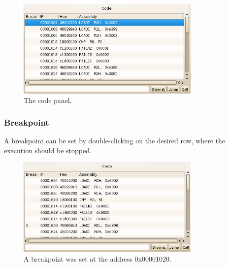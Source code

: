 \begin{figure}[H]
\begin{center}
	\includegraphics[width=0.8\textwidth]{./files/emu_gui_code_main.png}
\end{center}
	\caption{The code panel.}
\end{figure}

\subsubsection{Breakpoint}
A breakpoint can be set by double-clicking on the desired row, where the execution should be stopped.
\begin{figure}[H]
\begin{center}
	\includegraphics[width=0.8\textwidth]{./files/emu_gui_code_breakpoint.png}
\end{center}
	\caption{A breakpoint was set at the address 0x00001020.}
\end{figure}


